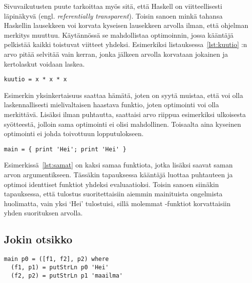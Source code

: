 \documentclass[finnish]{tktltiki2}
\begin{document}

Sivuvaikutusten puute tarkoittaa myös sitä, että Haskell on viitteellisesti läpinäkyvä (engl.
\emph{referentially transparent}). Toisin sanoen minkä tahansa Haskellin lausekkeen voi korvata
kyseisen lausekkeen arvolla ilman, että ohjelman merkitys muuttuu. Käytännössä se mahdollistaa
optimoinnin, jossa kääntäjä pelkistää kaikki toistuvat viitteet yhdeksi. Esimerkiksi
listauksessa~\ref{lst:kuutio} :n arvo pitää selvitää vain kerran, jonka jälkeen arvolla
korvataan jokainen  ja kertolaskut voidaan laskea.

\begin{lstlisting}[label={lst:kuutio},caption={Puhdas laskenta}]
kuutio = x * x * x
\end{lstlisting}

Esimerkin yksinkertaisuus saattaa hämätä, joten on syytä muistaa, että  voi olla
laskennallisesti mielivaltaisen haastava funktio, joten optimointi voi olla merkittävä. Lisäksi
ilman puhtautta, saattaisi  arvo riippua esimerkiksi ulkoisesta syötteestä, jolloin sama
optimointi ei olisi mahdollinen. Toisaalta aina kyseinen optimointi ei johda toivottuun
lopputulokseen.

\begin{lstlisting}[label={lst:samat},caption={Kaksi samaa funktiota}]
main = { print 'Hei'; print 'Hei' }
\end{lstlisting}

 Esimerkissä~\ref{lst:samat} on kaksi samaa funktiota, jotka lisäksi saavat saman arvon
argumentikseen. Tässäkin tapauksessa kääntäjä luottaa puhtauteen ja optimoi identtiset funktiot
yhdeksi evaluaatioksi. Toisin sanoen siinäkin tapauksessa, että tulostus suoritettaisiin aiemmin
mainituista ongelmista huolimatta, vain yksi `Hei' tulostuisi, sillä molemmat -funktiot
korvattaisiin yhden suorituksen arvolla.

\subsection{Jokin otsikko}

\begin{lstlisting}[label={lst:ratkaisu},caption={Ratkaisu}]
main p0 = ([f1, f2], p2) where
  (f1, p1) = putStrLn p0 'Hei'
  (f2, p2) = putStrLn p1 'maailma'
\end{lstlisting}

\end{document}
